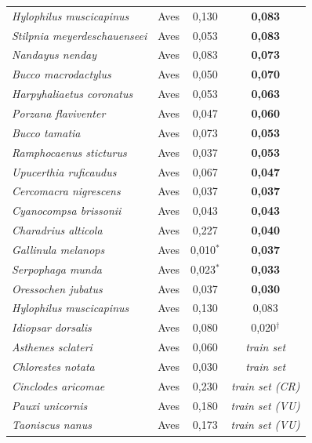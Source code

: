 \documentclass[12pt,a4paper]{article}
\begin{document}
\begin{longtable}{p{5cm}lcc}
  \textit{Hylophilus muscicapinus}    & Aves & 0,130 & \textbf{0,083} \\
  \textit{Stilpnia meyerdeschauenseei}& Aves & 0,053 & \textbf{0,083} \\
  \textit{Nandayus nenday}            & Aves & 0,083 & \textbf{0,073} \\
  \textit{Bucco macrodactylus}        & Aves & 0,050 & \textbf{0,070} \\
  \textit{Harpyhaliaetus coronatus}   & Aves & 0,053 & \textbf{0,063} \\
  \textit{Porzana flaviventer}        & Aves & 0,047 & \textbf{0,060} \\
  \textit{Bucco tamatia}              & Aves & 0,073 & \textbf{0,053} \\
  \textit{Ramphocaenus sticturus}     & Aves & 0,037 & \textbf{0,053} \\
  \textit{Upucerthia ruficaudus}      & Aves & 0,067 & \textbf{0,047} \\
  \textit{Cercomacra nigrescens}      & Aves & 0,037 & \textbf{0,037} \\
  \textit{Cyanocompsa brissonii}      & Aves & 0,043 & \textbf{0,043} \\
  \textit{Charadrius alticola}        & Aves & 0,227 & \textbf{0,040} \\
  \textit{Gallinula melanops}         & Aves & 0,010$^*$ & \textbf{0,037} \\
  \textit{Serpophaga munda}           & Aves & 0,023$^*$ & \textbf{0,033} \\
  \textit{Oressochen jubatus}         & Aves & 0,037 & \textbf{0,030} \\
  \midrule
  \textit{Hylophilus muscicapinus}    & Aves & 0,130 & 0,083 \\
  \textit{Idiopsar dorsalis}          & Aves & 0,080 & 0,020$^\dagger$ \\
  \textit{Asthenes sclateri}          & Aves & 0,060 & \textit{train set} \\
  \textit{Chlorestes notata}          & Aves & 0,030 & \textit{train set} \\
  \textit{Cinclodes aricomae}         & Aves & 0,230 & \textit{train set (CR)} \\
  \textit{Pauxi unicornis}            & Aves & 0,180 & \textit{train set (VU)} \\
  \textit{Taoniscus nanus}            & Aves & 0,173 & \textit{train set (VU)} \\
  \midrule

\end{longtable}
\end{document}
